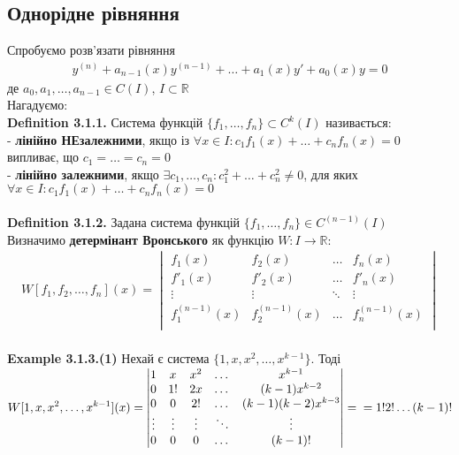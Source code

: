 \documentclass[a4paper, 14pt]{extarticle}
\def\huge{\displaystyle}
\def\defin#1{\textbf{Definition {#1}}}
\def\ex#1{\textbf{Example {#1}}}
\def\bigline{\vspace{5mm}\\}
\begin{document}
	\subsection{Однорідне рівняння}
	Спробуємо розв'язати рівняння
	\begin{align*}
	y^{(n)} + a_{n-1}(x)y^{(n-1)}+\dots+a_1(x)y'+a_0(x)y = 0
	\end{align*}
	де $a_0, a_1,\dots,a_{n-1}\in C(I)$, $I \subset \mathbb{R}$\\
	Нагадуємо:\\
	\defin{3.1.1.} Система функцій $\{f_1,\dots,f_n\} \subset C^k(I)$ називається:\\
	- \textbf{лінійно НЕзалежними}, якщо із $\forall x \in I: c_1f_1(x) + \dots + c_n f_n(x) = 0$ випливає, що $c_1 = \dots = c_n = 0$\\
	- \textbf{лінійно залежними}, якщо $\exists c_1, \dots, c_n: c_1^2 + \dots + c_n^2 \neq 0$, для яких $\forall x \in I: c_1f_1(x) + \dots + c_n f_n(x) = 0$\\
	\bigline
	\defin{3.1.2.} Задана система функцій $\{f_1, \dots, f_n\} \in C^{(n-1)}(I)$\\
	Визначимо \textbf{детермінант Вронського} як функцію $W: I \rightarrow \mathbb{R}:$
	\begin{align*}
W[f_1,f_2,\dots,f_n](x) = 
\begin{vmatrix} 
	f_1(x) &  f_2(x) & \dots & f_n(x) \\ 
	f'_1(x) &  f'_2(x) & \dots & f'_n(x) \\
	\vdots &  \vdots & \ddots & \vdots \\
	f^{(n-1)}_1(x) &  f^{(n-1)}_2(x) & \dots & f^{(n-1)}_n(x) \\ 
\end{vmatrix}
	\end{align*}
	\bigline
	\ex{3.1.3.(1)} Нехай є система $\{1,x,x^2,\dots,x^{k-1}\}$. Тоді\\
	$\huge W[1,x,x^2,\dots,x^{k-1}](x) = 
	\begin{vmatrix} 
	1 &  x & x^2 & \dots & x^{k-1} \\ 
	0 &  1! & 2x & \dots & (k-1)x^{k-2} \\ 
	0 &  0 & 2! & \dots & (k-1)(k-2)x^{k-3} \\
	\vdots & \vdots & \vdots & \ddots & \vdots \\
	0 &  0 & 0 & \dots & (k-1)! \\
\end{vmatrix} = \\ = 1! 2! \dots (k-1)!$
	\\
\end{document}

